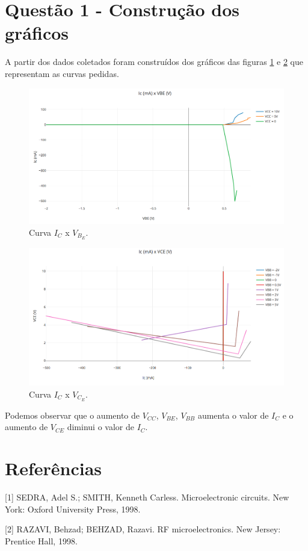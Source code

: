 \documentclass{abntex2}
\begin{document}
\section{Questão 1 - Construção dos gráficos}

A partir dos dados coletados foram construídos dos gráficos das figuras \ref{fig:curva1} e \ref{fig:curva2} que representam as curvas pedidas.

\begin{figure}[h]
  \centering
  \includegraphics[scale = 0.5]{icxvbe.png}
  \caption{Curva $I_C$ x $V_B_E$.}
  \label{fig:curva1}
\end{figure}


\begin{figure}[h]
  \centering
  \includegraphics[scale = 0.5]{icxvce.png}
  \caption{Curva $I_C$ x $V_C_E$.}
  \label{fig:curva2}
\end{figure}

Podemos observar que o aumento de $V_{CC}$, $V_{BE}$, $V_{BB}$ aumenta o valor de $I_C$ e o aumento de $V_{CE}$ diminui o valor de $I_C$.

\clearpage

\section*{Referências}

[1] SEDRA, Adel S.; SMITH, Kenneth Carless. Microelectronic circuits. New York: Oxford University Press, 1998.

[2] RAZAVI, Behzad; BEHZAD, Razavi. RF microelectronics. New Jersey: Prentice Hall, 1998.
\end{document}
